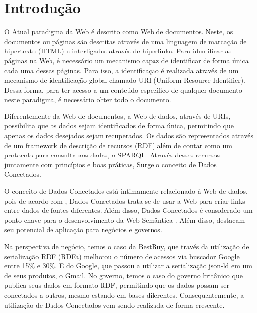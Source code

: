 \chapter{Introdução}
\label{cap:introducao}
O Atual paradigma da Web é descrito como Web de documentos. Neste, os documentos ou páginas são descritas através de uma linguagem de marcação de hipertexto (HTML) e interligados através de hiperlinks. Para identificar as páginas na Web, é necessário um mecanismo capaz de identificar de forma única cada uma dessas páginas. Para isso, a identificação é realizada através de um mecanismo de identificação global chamado URI (Uniform Resource Identifier). Dessa forma, para ter acesso a um conteúdo específico de qualquer documento neste paradigma, é necessário obter todo o documento.

Diferentemente da Web de documentos, a Web de dados, através de URIs, possibilita que os dados sejam identificados de forma única, permitindo que apenas os dados desejados sejam recuperados. Os dados são representados através de um framework de descrição de recursos (RDF) além de contar como um protocolo para consulta aos dados, o SPARQL. Através desses recursos juntamente com princípios e boas práticas, Surge o conceito de Dados Conectados.

 
O conceito de Dados Conectados está intimamente relacionado à Web de dados, pois de acordo com , Dados Conectados trata-se de usar a Web para criar links entre dados de fontes diferentes. Além disso, Dados Conectados é considerado um ponto chave para o desenvolvimento da Web Semântica \cite{berners2001semantic} . Além disso,  destacam seu potencial de aplicação para negócios e governos.  

Na perspectiva de negócio, temos o caso da BestBuy, que través da utilização de serialização RDF (RDFa) melhorou o número de acessos via buscador  Google entre 15\% e 30\%. E do Google, que passou a utilizar a serialização json-ld em um de seus produtos, o Gmail. No governo, temos o caso do governo britânico que publica seus dados em formato RDF, permitindo que os dados possam ser conectados a outros, mesmo estando em bases diferentes. Consequentemente, a utilização de Dados Conectados vem sendo realizada de forma crescente.

